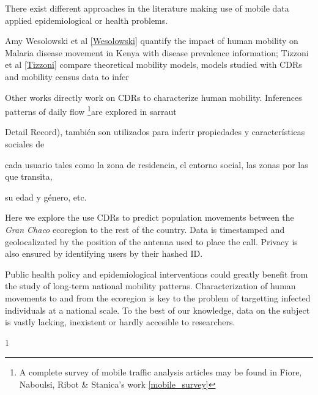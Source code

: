 There exist different approaches in the literature making use of mobile data applied epidemiological or health problems. \begin{comment} La siguiente info la saco de aqui  https://docs.google.com/document/d/1ZClgYFTLCxmg7wvRXqz2V1EP7Wcg0vd2ZwEBOLW2VOk \end{comment} Amy Wesolowski et al \ref{Wesolowski} quantify the impact of human mobility on Malaria disease movement in Kenya with disease prevalence information;   Tizzoni et al \ref{Tizzoni} compare theoretical mobility models, models studied with CDRs and mobility census data to infer 

Other works directly work on CDRs to characterize human mobility. Inferences patterns of daily flow 
\footnote{A complete survey of mobile traffic analysis articles may be found in Fiore, Naboulsi, Ribot & Stanica's work \ref{mobile_survey} }are explored in sarraut



Detail Record), también son utilizados para inferir propiedades y características sociales de

cada usuario tales como la zona de residencia, el entorno social, las zonas por las que transita,

su edad y género, etc.


Here we explore the use CDRs to predict population movements between the \textit{Gran Chaco} ecoregion to the rest of the country. Data is timestamped and geolocalizated by the position of the antenna used to place the call. Privacy is also ensured by identifying users by their hashed ID. \begin{comment}el tema de la privacidad es siempre tan importante que lo pongo aca... haria falta agregar que no tenemos acceso a las claves de encriptacion. \end{comment}

Public health policy and epidemiological interventions could greatly benefit from the study of long-term national mobility patterns. Characterization of human movements to and from the ecoregion is key to the problem of targetting infected individuals at a national scale. To the best of our knowledge, data on the subject is vastly lacking, inexistent or hardly accesible to researchers. 

1